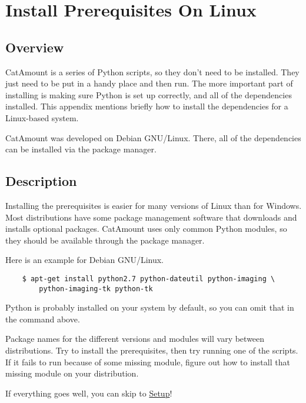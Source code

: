 \chapter{Install Prerequisites On Linux}
\hypertarget{prereq-linux}{}

\section{Overview}

CatAmount is a series of Python scripts, so they don't need to be
installed. They just need to be put in a handy place and then run.
The more important part of installing is making sure Python is
set up correctly, and all of the dependencies installed. This
appendix mentions briefly how to install the dependencies for
a Linux-based system.

CatAmount was developed on Debian GNU/Linux. There, all of the
dependencies can be installed via the package manager.


\section{Description}

Installing the prerequisites is easier for many versions of Linux than
for Windows. Most distributions have some package management software
that downloads and installs optional packages. CatAmount uses only
common Python modules, so they should be available through the package
manager.

Here is an example for Debian GNU/Linux.

\begin{verbatim}
    $ apt-get install python2.7 python-dateutil python-imaging \
        python-imaging-tk python-tk
\end{verbatim}

Python is probably installed on your system by default, so you can
omit that in the command above.

Package names for the different versions and modules will vary between
distributions. Try to install the prerequisites, then try running one
of the scripts. If it fails to run because of some missing module, figure
out how to install that missing module on your distribution.

If everything goes well, you can skip to \hyperlink{setup}{Setup}!
